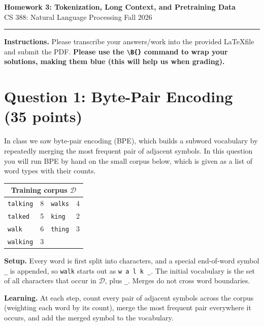 \documentclass[11pt]{article}
\newcommand{\wrd}[1]{\texttt{#1}}
\newcommand{\eow}{\texttt{\_}}
\begin{document}
\begin{center}
  {\Large\bfseries Homework 3: Tokenization, Long Context, and Pretraining Data}\\[2pt]
  {\normalsize CS 388: Natural Language Processing \quad\textbullet\quad Fall 2026}\\[2pt]
\end{center}
\vspace{0.5em}
\hrule
\vspace{1em}

\noindent
\textbf{Instructions.} Please transcribe your answers/work into the provided \LaTeX file and submit
the PDF.
\textbf{Please use the {\tt{\textbackslash B\{\}}} command to wrap your solutions, making them blue (this will help us when grading).}

\section{Question 1: Byte-Pair Encoding (35 points)}

In class we saw byte-pair encoding (BPE), which builds a subword vocabulary by repeatedly merging the most frequent
pair of adjacent symbols. In this question you will run BPE by hand on the small corpus below, which is given as a
list of word types with their counts.

\begin{center}
\begin{tabular}{lr@{\hskip 3em}lr}
\toprule
\multicolumn{4}{c}{\textbf{Training corpus} $\mathcal{D}$}\\
\midrule
\wrd{talking} & 8 & \wrd{walks}  & 4\\
\wrd{talked}  & 5 & \wrd{king}   & 2\\
\wrd{walk}    & 6 & \wrd{thing}  & 3\\
\wrd{walking} & 3 &              &  \\
\bottomrule
\end{tabular}
\end{center}

\noindent
\textbf{Setup.} Every word is first split into characters, and a special end-of-word symbol \eow{} is appended,
so \wrd{walk} starts out as \wrd{w a l k \eow}. The initial vocabulary is the set of all characters that occur in
$\mathcal{D}$, plus \eow{}. Merges do not cross word boundaries.

\medskip\noindent
\textbf{Learning.} At each step, count every pair of adjacent symbols across the corpus (weighting each word by its
count), merge the most frequent pair everywhere it occurs, and add the merged symbol to the vocabulary.
\end{document}
